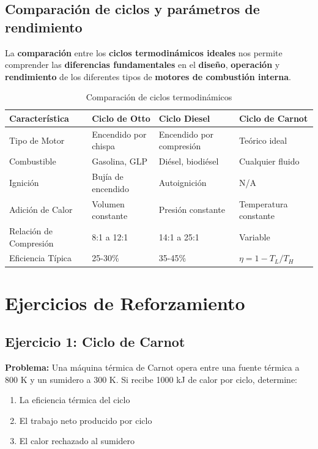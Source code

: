 \documentclass{article}
\begin{document}
    \subsection{Comparación de ciclos y parámetros de rendimiento}

    La \textbf{comparación} entre los \textbf{ciclos termodinámicos ideales} nos permite comprender las \textbf{diferencias fundamentales} en el \textbf{diseño}, \textbf{operación} y \textbf{rendimiento} de los diferentes tipos de \textbf{motores de combustión interna}.

    \begin{table}[h]
    \centering
    \caption{Comparación de ciclos termodinámicos}
    \begin{tabular}{|l|l|l|l|}
    \hline
    \textbf{Característica} & \textbf{Ciclo de Otto} & \textbf{Ciclo Diesel} & \textbf{Ciclo de Carnot} \\
    \hline
    Tipo de Motor & Encendido por chispa & Encendido por compresión & Teórico ideal \\
    \hline
    Combustible & Gasolina, GLP & Diésel, biodiésel & Cualquier fluido \\
    \hline
    Ignición & Bujía de encendido & Autoignición & N/A \\
    \hline
    Adición de Calor & Volumen constante & Presión constante & Temperatura constante \\
    \hline
    Relación de Compresión & 8:1 a 12:1 & 14:1 a 25:1 & Variable \\
    \hline
    Eficiencia Típica & 25-30\% & 35-45\% & $\eta = 1 - T_L/T_H$ \\
    \hline
    \end{tabular}
    \label{tab:comparacion_ciclos}
    \end{table}

    \section{Ejercicios de Reforzamiento}

    \subsection{Ejercicio 1: Ciclo de Carnot}

    \textbf{Problema:} Una máquina térmica de Carnot opera entre una fuente térmica a 800 K y un sumidero a 300 K. Si recibe 1000 kJ de calor por ciclo, determine:
    \begin{enumerate}
        \item La eficiencia térmica del ciclo
        \item El trabajo neto producido por ciclo  
        \item El calor rechazado al sumidero
    \end{enumerate}
\end{document}
